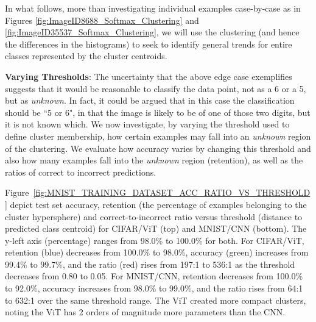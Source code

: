 In what follows, more than investigating individual examples case-by-case as in Figures \ref{fig:ImageID8688_Softmax_Clustering} and \ref{fig:ImageID35537_Softmax_Clustering}, we will use the clustering (and hence the differences in the histograms) to seek to identify general trends for entire classes represented by the cluster centroids.

\textbf{Varying Thresholds}: The uncertainty that the above edge case exemplifies suggests that it would be reasonable to classify the data point, not as a 6 or a 5, but as \textit{unknown}. In fact, it could be argued that in this case the classification should be ``5 or 6", in that the image is likely to be of one of those two digits, but it is not known which. We now investigate, by varying the threshold used to define cluster membership, how certain examples may fall into an \textit{unknown} region of the clustering. We evaluate how accuracy varies by changing this threshold and also how many examples fall into the \textit{unknown} region (retention), as well as the ratios of correct to incorrect predictions. 

Figure~\ref{fig:MNIST_TRAINING_DATASET_ACC_RATIO_VS_THRESHOLD} depict test set accuracy, retention (the percentage of examples belonging to the cluster hypersphere) and correct-to-incorrect ratio versus threshold (distance to predicted class centroid) for CIFAR/ViT (top) and MNIST/CNN (bottom). The y-left axis (percentage) ranges from 98.0\% to 100.0\% for both. For CIFAR/ViT, retention (blue) decreases from 100.0\% to 98.0\%, accuracy (green) increases from 99.4\% to 99.7\%, and the ratio (red) rises from 197:1 to 536:1 as the threshold decreases from 0.80 to 0.05. For MNIST/CNN, retention decreases from 100.0\% to 92.0\%, accuracy increases from 98.0\% to 99.0\%, and the ratio rises from 64:1 to 632:1 over the same threshold range. The ViT created more compact clusters, noting the ViT has 2 orders of magnitude more parameters than the CNN.


